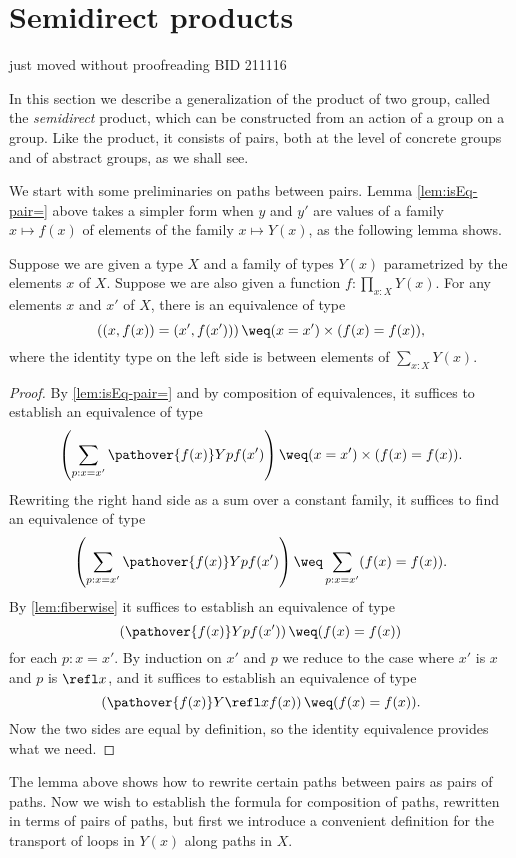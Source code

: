\section{Semidirect products}
\label{sec:Semidirect-products}{\color{red} just moved without proofreading BID 211116}

In this section we describe a generalization of the product of two group, called the {\em semidirect} product, which can be constructed from an
action of a group on a group.  Like the product, it consists of pairs, both at the level of concrete groups and of abstract groups, as we shall
see.

We start with some preliminaries on paths between pairs.
Lemma \cref{lem:isEq-pair=} above takes a simpler form when $y$ and $y'$ are values of a family $x \mapsto f(x)$
of elements of the family $x \mapsto Y(x)$, as the following lemma shows.

\begin{lemma}\label{lem:pathpairsection}
  Suppose we are given a type $X$ and a family of types $Y(x)$ parametrized by the elements $x$ of $X$.
  Suppose we are also given a function $f : \prod_{x:X} Y(x)$.
  For any elements $x$ and $x'$ of $X$,
  there is an equivalence of type
  $$\left ( (x,f(x)) = (x',f(x')) \right ) \weq (x=x') \times (f(x) = f(x)),$$
  where the identity type on the left side is between elements of $\sum_{x:X} Y(x)$.
\end{lemma}

\begin{proof}
  By \cref{lem:isEq-pair=} and by composition of equivalences, it suffices to establish an equivalence of type
  $$\left( \sum_{p:x=x'} \pathover {f(x)} Y p {f(x')} \right) \weq (x=x') \times (f(x) = f(x)).$$
  Rewriting the right hand side as a sum over a constant family, it suffices to find an equivalence of type
  $$\left( \sum_{p:x=x'} \pathover {f(x)} Y p {f(x')} \right) \weq \sum_{p:x=x'} (f(x) = f(x)).$$
  By \cref{lem:fiberwise} it suffices to establish an equivalence of type
  $$ \left( \pathover {f(x)} Y p {f(x')} \right) \weq (f(x) = f(x))$$
  for each $p:x=x'$.  By induction on $x'$ and $p$ we reduce to the case where $x'$ is $x$ and $p$ is $\refl x$, and it suffices to establish an
  equivalence of type
  $$ \left( \pathover {f(x)} Y {\refl x} {f(x)} \right) \weq (f(x) = f(x)).$$
  Now the two sides are equal by definition, so the identity equivalence provides what we need.
\end{proof}

The lemma above shows how to rewrite certain paths between pairs as pairs of paths.  Now we wish to establish the formula for composition of
paths, rewritten in terms of pairs of paths, but first we introduce a convenient definition for the transport of loops in $Y(x)$ along paths in
$X$.


